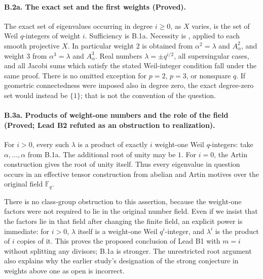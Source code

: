 \paragraph{B.2a. The exact set and the first weights (Proved).}
\label{B2a}
The exact set of eigenvalues occurring in degree $i\geq0$, as $X$ varies,
is the set of Weil $q$-integers of weight $i$. Sufficiency is B.1a.
Necessity is \citet[Th\'eor\`eme~(1.6), p.~276]{Deligne1974}, applied
to each smooth projective $X$. In particular weight $2$ is obtained
from $\alpha^2=\lambda$ and $A_\alpha^2$, and weight $3$ from
$\alpha^3=\lambda$ and $A_\alpha^3$. Real numbers
$\lambda=\pm q^{i/2}$, all supersingular cases, and all Jacobi sums
which satisfy the stated Weil-integer condition fall under the same
proof. There is no omitted exception for $p=2$, $p=3$, or nonsquare $q$.
If geometric connectedness were imposed also in degree zero, the exact
degree-zero set would instead be $\{1\}$; that is not the convention
of the question.

\paragraph{B.3a. Products of weight-one numbers and the role of the field
(Proved; Lead B2 refuted as an obstruction to realization).}
\label{B3a}
For $i>0$, every such $\lambda$ is a product of exactly $i$ weight-one
Weil $q$-integers: take $\alpha,\ldots,\alpha$ from B.1a. The additional
root of unity may be $1$. For $i=0$, the Artin construction gives the
root of unity itself. Thus every eigenvalue in question occurs in an
effective tensor construction from abelian and Artin motives over the
original field $\mathbb F_q$.

There is no class-group obstruction to this assertion, because the
weight-one factors were not required to lie in the original number
field. Even if we insist that the factors lie in that field after
changing the finite field, an explicit power is immediate: for $i>0$,
$\lambda$ itself is a weight-one Weil $q^i$-integer, and $\lambda^i$
is the product of $i$ copies of it. This proves the proposed conclusion
of Lead B1 with $m=i$ without splitting any divisors; B.1a is stronger.
The unrestricted root argument also explains why the earlier study's
designation of the strong conjecture in weights above one as open is
incorrect.

